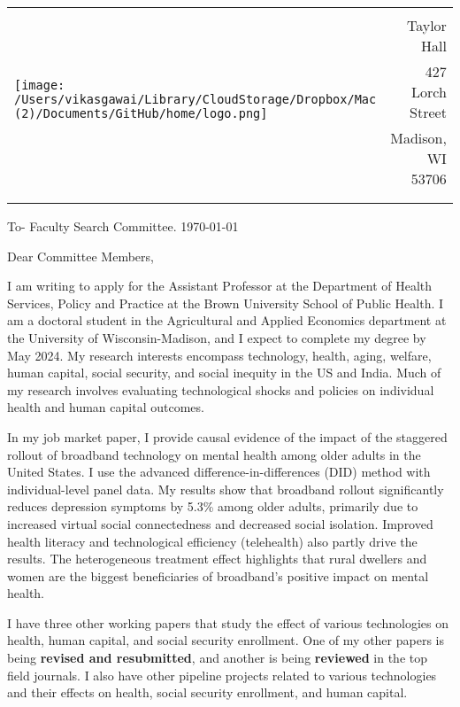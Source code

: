 \documentclass[12pt]{letter}
\begin{document}
\begin{tabularx}{\textwidth}{Xr}
\multirow{4}{*}{\texttt{[image: /Users/vikasgawai/Library/CloudStorage/Dropbox/Mac (2)/Documents/GitHub/home/logo.png]}} &  \\
& Taylor Hall \\
& 427 Lorch Street \\
& Madison, WI 53706 \\
[-1.8ex]\\
\\
\end{tabularx}

To- Faculty Search Committee. \hfill \today 
\medskip

Dear Committee Members,

I am writing to apply for the Assistant Professor at the Department of Health Services, Policy and Practice at the Brown University School of Public Health. I am a doctoral student in the Agricultural and Applied Economics department at the University of Wisconsin-Madison, and I expect to complete my degree by May 2024. My research interests encompass technology, health, aging, welfare, human capital, social security, and social inequity in the US and India. Much of my research involves evaluating technological shocks and policies on individual health and human capital outcomes.

In my job market paper, I provide causal evidence of the impact of the staggered rollout of broadband technology on mental health among older adults in the United States. I use the advanced difference-in-differences (DID) method with individual-level panel data. My results show that broadband rollout significantly reduces depression symptoms by 5.3\% among older adults, primarily due to increased virtual social connectedness and decreased social isolation. Improved health literacy and technological efficiency (telehealth) also partly drive the results. The heterogeneous treatment effect highlights that rural dwellers and women are the biggest beneficiaries of broadband’s positive impact on mental health. 


I have three other working papers that study the effect of various technologies on health, human capital, and social security enrollment. One of my other papers is being \textbf{revised and resubmitted}, and another is being  \textbf{reviewed} in the top field journals. I also have other pipeline projects related to various technologies and their effects on health, social security enrollment, and human capital.
\end{document}
